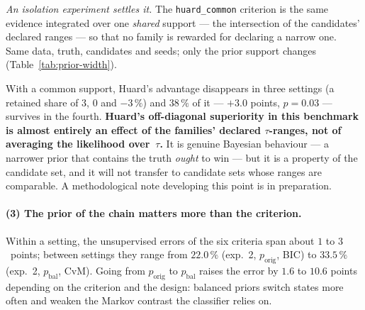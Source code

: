 \documentclass[11pt,a4paper]{article}
\newcommand{\porig}{p_{\text{orig}}}
\newcommand{\pbal}{p_{\text{bal}}}
\begin{document}
\begin{table}[htbp]
  \centering\small
  \caption{Off-diagonal recovery by cell, Huard vs MLE (earlier benchmark),
           and McNemar discordance (Huard only : MLE only).}
  \label{tab:huard-cells}
  
\end{table}

\emph{An isolation experiment settles it.} The \texttt{huard\_common}
criterion is the same evidence integrated over one \emph{shared} support ---
the intersection of the candidates' declared ranges --- so that no family is
rewarded for declaring a narrow one. Same data, truth, candidates and seeds;
only the prior support changes (Table~\ref{tab:prior-width}).

\begin{table}[htbp]
  \centering\small
  \caption{Off-diagonal recovery with Huard's own supports and with a common
           support. ``Edge retained'': share of Huard's advantage over MLE
           that survives the common support. Discordance: Huard only : common
           only.}
  \label{tab:prior-width}
  \setlength{\tabcolsep}{3.5pt}
  
\end{table}

With a common support, Huard's advantage disappears in three settings (a
retained share of $3$, $0$ and $-3\,\%$) and $38\,\%$ of it --- $+3.0$
points, $p=0.03$ --- survives in the fourth. \textbf{Huard's off-diagonal
superiority in this benchmark is almost entirely an effect of the families'
declared $\tau$-ranges, not of averaging the likelihood over~$\tau$.} It is
genuine Bayesian behaviour --- a narrower prior that contains the truth
\emph{ought} to win --- but it is a property of the candidate set, and it will
not transfer to candidate sets whose ranges are comparable. A methodological
note developing this point is in preparation.

\paragraph{(3) The prior of the chain matters more than the criterion.}
Within a setting, the unsupervised errors of the six criteria span about
$1$ to $3$~points; between settings they range from $22.0\,\%$ (exp.~2,
$\porig$, BIC) to $33.5\,\%$ (exp.~2, $\pbal$, CvM). Going from $\porig$ to
$\pbal$ raises the error by $1.6$ to $10.6$ points depending on the criterion and the
design: balanced priors switch states more often and weaken the Markov
contrast the classifier relies on.
\end{document}
